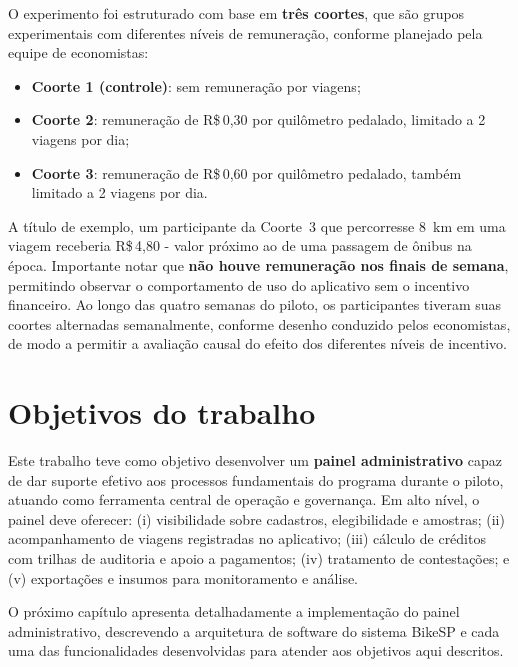O experimento foi estruturado com base em \textbf{três coortes}, que são grupos experimentais com diferentes níveis de
remuneração, conforme planejado pela equipe de economistas:
\begin{itemize}
  \item \textbf{Coorte 1 (controle)}: sem remuneração por viagens;
  \item \textbf{Coorte 2}: remuneração de R\$\,0,30 por quilômetro pedalado,
        limitado a 2 viagens por dia;
  \item \textbf{Coorte 3}: remuneração de R\$\,0,60 por quilômetro pedalado,
        também limitado a 2 viagens por dia.
\end{itemize}
A título de exemplo, um participante da Coorte~3 que percorresse 8~km em uma
viagem receberia R\$\,4,80 - valor próximo ao de uma passagem de ônibus na
época. Importante notar que \textbf{não houve remuneração nos finais de semana},
permitindo observar o comportamento de uso do aplicativo sem o incentivo
financeiro. Ao longo das quatro semanas do piloto, os participantes tiveram suas
coortes alternadas semanalmente, conforme desenho conduzido pelos economistas,
de modo a permitir a avaliação causal do efeito dos diferentes níveis de
incentivo.


\section{Objetivos do trabalho}
\label{sec:objetivos-trabalho}
Este trabalho teve como objetivo desenvolver um \textbf{painel administrativo} capaz
de dar suporte efetivo aos processos fundamentais do programa durante o piloto,
atuando como ferramenta central de operação e governança. Em alto nível, o
painel deve oferecer: (i) visibilidade sobre cadastros, elegibilidade e
amostras; (ii) acompanhamento de viagens registradas no aplicativo; (iii)
cálculo de créditos com trilhas de auditoria e apoio a pagamentos; (iv)
tratamento de contestações; e (v) exportações e insumos para monitoramento e
análise.

O próximo capítulo apresenta detalhadamente a implementação do painel administrativo, descrevendo a arquitetura de software do sistema BikeSP e cada uma das funcionalidades desenvolvidas para atender aos objetivos aqui descritos.


